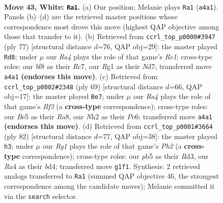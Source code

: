 \documentclass[11pt]{article}
\begin{document}
\clearpage

\begin{figure}[p]\centering
\begin{subfigure}{0.46\textwidth}\centering
\resizebox{\linewidth}{!}{%
\newchessgame
\chessboard[
  setfen={5b1r/r2k2p1/p1p4p/Pp1bBp2/R1p4P/4P1P1/1P3P1N/3K2R1 w - - 2 43},
  showmover=false,
  pgfstyle=straightmove, color=movearrow, markmove={a4-a1}
]}
\caption{}
\end{subfigure}\hfill
\begin{subfigure}{0.46\textwidth}\centering
\resizebox{\linewidth}{!}{%
\newchessgame
\chessboard[
  setfen={4r1k1/2rn2b1/1p1N2pp/pP1P4/P4P2/2p2B1P/2R1PP1K/2B5 b - - 0 39},
  showmover=false,
  pgfstyle=straightmove, color=movearrow, markmove={e8-d8}
]}
\caption{}
\end{subfigure}
\\[4pt]
\begin{subfigure}{0.46\textwidth}\centering
\resizebox{\linewidth}{!}{%
\newchessgame
\chessboard[
  setfen={rr3k2/1p3p2/4pbp1/1BPp4/P2P3p/K3P2P/2R3P1/3R4 b - - 0 35},
  showmover=false,
  pgfstyle=straightmove, color=movearrow, markmove={f6-e7}
]}
\caption{}
\end{subfigure}\hfill
\begin{subfigure}{0.46\textwidth}\centering
\resizebox{\linewidth}{!}{%
\newchessgame
\chessboard[
  setfen={8/4k1p1/p1rp1p1p/1p2pP2/1B1bP3/PP1R4/2P3PP/3K4 w - - 13 42},
  showmover=false,
  pgfstyle=straightmove, color=movearrow, markmove={h2-h3}
]}
\caption{}
\end{subfigure}
\caption{\textbf{Move 43, White: \texttt{Ra1}.} (a) Our position; Melanie plays \texttt{Ra1} (\texttt{a4a1}). Panels (b)--(d) are the retrieved master positions whose correspondence most drove this move (highest QAP objective among those that transfer to it). (b) Retrieved from \texttt{ccrl\_top\_p0000\#3947} (ply 77) [structural distance $d$=76, QAP obj=29]: the master played \texttt{Rd8}; under $\mu$ our \emph{Ra4} plays the role of that game's \emph{Re1}; cross-type roles: our \emph{b}f8 as their \emph{R}c7, our \emph{R}g1 as their \emph{N}d7; transferred move \texttt{a4a1} \textbf{(endorses this move)}. (c) Retrieved from \texttt{ccrl\_top\_p0002\#2348} (ply 69) [structural distance $d$=66, QAP obj=17]: the master played \texttt{Be7}; under $\mu$ our \emph{Ra4} plays the role of that game's \emph{Bf3} (a \textbf{cross-type} correspondence); cross-type roles: our \emph{B}e5 as their \emph{R}a8, our \emph{N}h2 as their \emph{P}e6; transferred move \texttt{a4a1} \textbf{(endorses this move)}. (d) Retrieved from \texttt{ccrl\_top\_p0001\#3664} (ply 82) [structural distance $d$=77, QAP obj=38]: the master played \texttt{h3}; under $\mu$ our \emph{Rg1} plays the role of that game's \emph{Ph2} (a \textbf{cross-type} correspondence); cross-type roles: our \emph{p}b5 as their \emph{R}d3, our \emph{R}a4 as their \emph{b}d4; transferred move \texttt{g1f1}. Synthesis: 2 retrieved analogs transferred to \texttt{Ra1} (summed QAP objective 46, the strongest correspondence among the candidate moves); Melanie committed it via the \texttt{search} selector.}
\label{fig:thought-m84}
\end{figure}
\end{document}
